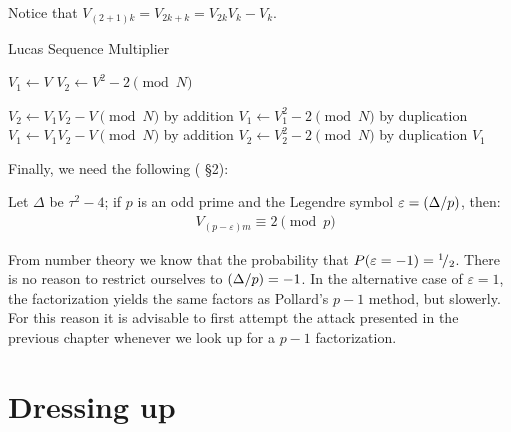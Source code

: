 Notice that $V_{(2+1)k} = V_{2k +k} = V_{2k}V_k - V_k$.

\begin{algorithm}[H]
  \caption{Lucas Sequence Multiplier}
  \begin{algorithmic}[1]
      \State $V_1 \gets V$
      \State $V_2 \gets V^2 - 2 \pmod{N}$

          \State $V_2 \gets V_1V_2 - V \pmod{N}$
          \Comment by addition %
          \State $V_1 \gets V_1^2 -2 \pmod{N}$
          \Comment by duplication %
          \State $V_1 \gets V_1V_2 - V \pmod{N}$
          \Comment by addition %
          \State $V_2 \gets V_2^2 -2 \pmod{N}$
          \Comment by duplication %
        \EndIf
      \EndFor
      \State \Return $V_1$
    \EndFunction
  \end{algorithmic}
\end{algorithm}

Finally, we need the following (\cite{Williams:p+1} \S 2):
\begin{theorem*}[Lehmer]
  Let $\Delta$ be $\tau^2-4$;
  if $p$ is an odd prime and the Legendre symbol
  $\varepsilon = ({\Delta}/{p})$, then:
  \begin{align*}
  &  V_{(p - \varepsilon)m} \equiv 2 \pmod{p}
  \end{align*}
\end{theorem*}



\begin{remark}
  From number theory we know that the probability that
  $P(\varepsilon = -1) = {}^{1}\!/_{2}$.
  There is no reason to restrict ourselves to
  $({\Delta}/{p}) = -1$.
  In the alternative case of $\varepsilon = 1$, the factorization yields the
  same factors as Pollard's $p-1$ method, but slowerly.
  For this reason it is advisable to first attempt the attack presented in the
  previous chapter \cite{Williams:p+1}whenever we look up for a $p-1$
  factorization.
\end{remark}


\section{Dressing up}

